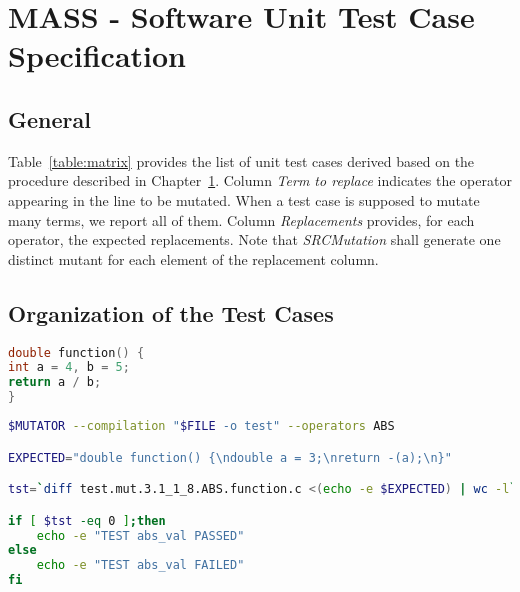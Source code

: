 
\chapter{MASS - Software Unit Test Case Specification}
\label{chap:spec}

\section{General}




Table~\ref{table:matrix} provides the list of unit test cases derived based on the procedure described in Chapter~\ref{chap:spec}.
Column \emph{Term to replace} indicates the operator appearing in the line to be mutated. When a test case is supposed to mutate many terms, we report all of them.
Column \emph{Replacements} provides, for each operator, the expected replacements.
Note that \emph{SRCMutation} shall generate one distinct mutant for each element of the replacement column.









\clearpage

\section{Organization of the Test Cases}

\begin{lstlisting}[language=C, label=test_source, caption=C function example.]
double function() {
int a = 4, b = 5;
return a / b;
}
\end{lstlisting}

\begin{lstlisting}[language=bash, label=test_example, caption=ABS test case example.]
$MUTATOR --compilation "$FILE -o test" --operators ABS

EXPECTED="double function() {\ndouble a = 3;\nreturn -(a);\n}"

tst=`diff test.mut.3.1_1_8.ABS.function.c <(echo -e $EXPECTED) | wc -l`

if [ $tst -eq 0 ];then
    echo -e "TEST abs_val PASSED"
else
    echo -e "TEST abs_val FAILED"
fi
\end{lstlisting}


